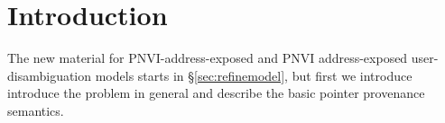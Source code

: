 \documentclass[acmsmall,review,screen]{acmart}\settopmatter{printfolios=true,printccs=false,printacmref=false}
\begin{document}
\maketitle



\newcommand{\myt}[1]{{\color{blue}#1}}
\newcommand{\myu}[1]{{\color{myudicolor}#1}}

\vspace*{-\baselineskip}
\tableofcontents

\vspace*{-3\baselineskip}
\section{Introduction}

The new material for PNVI-address-exposed and PNVI address-exposed
user-disambiguation models starts in \S\ref{sec:refinemodel}, but
first we introduce introduce the problem in general and describe the
basic pointer provenance semantics. 
\end{document}
